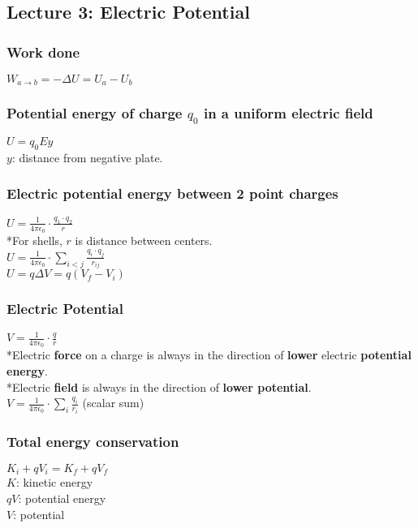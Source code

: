 \documentclass[10 pt]{article}
\begin{document}
\begin{multicols}{2}
\subsection*{Lecture 3: Electric Potential}
\subsubsection*{Work done}
$W_{a\rightarrow b} = - \Delta U = U_{a} - U_{b}$
\subsubsection*{Potential energy of charge $q_{0}$ in a uniform electric field}
 $U = q_{0}Ey$ \\
$y$: distance from negative plate.

\subsubsection*{Electric potential energy between 2 point charges}
$U = \frac{1}{4 \pi \epsilon_{0}} \cdot \frac{q_{1} \cdot q_{2}}{r}$ \\
\normalsize
*For shells, $r$ is distance between centers. \\
$U = \frac{1}{4 \pi \epsilon_{0}} \cdot \sum_{i<j} \frac{q_{i} \cdot q_{j}}{r_{ij}}$ \\
$U = q \Delta V = q(V_{f} - V_{i})$

\subsubsection*{Electric Potential}
$V = \frac{1}{4 \pi \epsilon_{0}} \cdot \frac{q}{r}$ \\
\normalsize
*Electric \textbf{force} on a charge is always in the direction of \textbf{lower} electric \textbf{potential energy}. \\
*Electric \textbf{field} is always in the direction of \textbf{lower potential}. \\
$V = \frac{1}{4 \pi \epsilon_{0}} \cdot \sum_{i} \frac{q_{i}}{r_{i}}$ (scalar sum)

\subsubsection*{Total energy conservation}
$K_{i} + qV_{i} = K_{f} + qV_{f}$ \\
\normalsize
$K$: kinetic energy \\
$qV$: potential energy \\
$V$: potential


\end{multicols}
\end{document}
